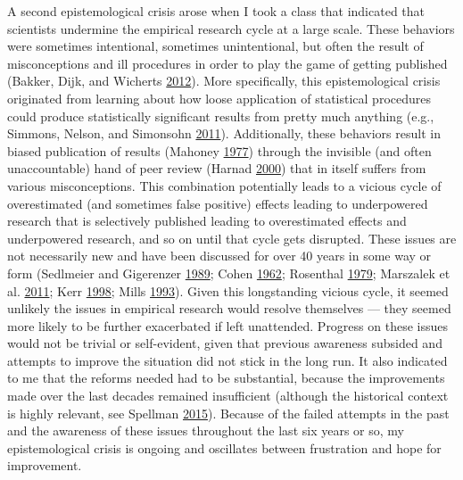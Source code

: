 \documentclass[a5paper]{book}
\begin{document}
A second epistemological crisis arose when I took a class that indicated
that scientists undermine the empirical research cycle at a large scale.
These behaviors were sometimes intentional, sometimes unintentional, but
often the result of misconceptions and ill procedures in order to play
the game of getting published (Bakker, Dijk, and Wicherts
\protect\hyperlink{ref-doi:10.1177ux2f1745691612459060}{2012}). More
specifically, this epistemological crisis originated from learning about
how loose application of statistical procedures could produce
statistically significant results from pretty much anything (e.g.,
Simmons, Nelson, and Simonsohn
\protect\hyperlink{ref-doi:10.1177ux2f0956797611417632}{2011}).
Additionally, these behaviors result in biased publication of results
(Mahoney \protect\hyperlink{ref-doi:10.1007ux2fbf01173636}{1977})
through the invisible (and often unaccountable) hand of peer review
(Harnad \protect\hyperlink{ref-cogprints1646}{2000}) that in itself
suffers from various misconceptions. This combination potentially leads
to a vicious cycle of overestimated (and sometimes false positive)
effects leading to underpowered research that is selectively published
leading to overestimated effects and underpowered research, and so on
until that cycle gets disrupted. These issues are not necessarily new
and have been discussed for over 40 years in some way or form (Sedlmeier
and Gigerenzer
\protect\hyperlink{ref-doi:10.1037ux2f0033-2909.105.2.309}{1989}; Cohen
\protect\hyperlink{ref-doi:10.1037ux2fh0045186}{1962}; Rosenthal
\protect\hyperlink{ref-doi:10.1037ux2f0033-2909.86.3.638}{1979};
Marszalek et al.
\protect\hyperlink{ref-doi:10.2466ux2f03.11.pms.112.2.331-348}{2011};
Kerr \protect\hyperlink{ref-doi:10.1207ux2fs15327957pspr0203_4}{1998};
Mills \protect\hyperlink{ref-doi:10.1056ux2fnejm199310143291613}{1993}).
Given this longstanding vicious cycle, it seemed unlikely the issues in
empirical research would resolve themselves --- they seemed more likely
to be further exacerbated if left unattended. Progress on these issues
would not be trivial or self-evident, given that previous awareness
subsided and attempts to improve the situation did not stick in the long
run. It also indicated to me that the reforms needed had to be
substantial, because the improvements made over the last decades
remained insufficient (although the historical context is highly
relevant, see Spellman
\protect\hyperlink{ref-doi:10.1177ux2f1745691615609918}{2015}). Because
of the failed attempts in the past and the awareness of these issues
throughout the last six years or so, my epistemological crisis is
ongoing and oscillates between frustration and hope for improvement.
\end{document}
